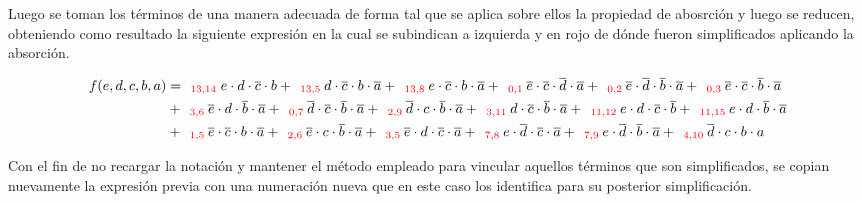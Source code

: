 Luego se toman los t\'erminos de una manera adecuada de forma tal que se aplica sobre ellos la propiedad de abosrci\'on 
y luego se reducen, obteniendo como resultado la siguiente expresi\'on en la cual se subindican a izquierda y en rojo de d\'onde
fueron simplificados aplicando la absorci\'on.

\begin{align*}
f(e,d,c,b,a) & = _{\ \ \color{red} 13,14} {e \cdot d \cdot \overline{c} \cdot b} 
+ _{\ \ \color{red} 13,5}  {d \cdot \overline{c} \cdot b \cdot \overline{a}}
+ _{\ \ \color{red} 13,8}  {e \cdot \overline{c} \cdot b \cdot \overline{a}}
+ _{\ \ \color{red} 0,1}  {\overline{e} \cdot \overline{c} \cdot \overline{d} \cdot \overline{a}}
+ _{\ \ \color{red} 0,2}  {\overline{e} \cdot \overline{d} \cdot \overline{b} \cdot \overline{a}}
+ _{\ \ \color{red} 0,3}  {\overline{e} \cdot \overline{c} \cdot \overline{b} \cdot \overline{a}} \\
& + _{\ \ \color{red} 3,6}  {\overline{e} \cdot d \cdot \overline{b} \cdot \overline{a}} 
+ _{\ \ \color{red} 0,7}  {\overline{d} \cdot \overline{c} \cdot \overline{b} \cdot \overline{a}}
+ _{\ \ \color{red} 2,9}  {\overline{d} \cdot c \cdot \overline{b} \cdot \overline{a}}
+ _{\ \ \color{red} 3,11}  {d \cdot \overline{c} \cdot \overline{b} \cdot \overline{a}} 
+ _{\ \ \color{red} 11,12}  {e \cdot d \cdot \overline{c} \cdot \overline{b}}
+ _{\ \ \color{red} 11,15}  {e \cdot d \cdot \overline{b} \cdot \overline{a}} \\
& + _{\ \ \color{red} 1,5}  {\overline{e} \cdot \overline{c} \cdot b \cdot \overline{a}}
+ _{\ \ \color{red} 2,6}  {\overline{e} \cdot c \cdot \overline{b} \cdot \overline{a}} 
+ _{\ \ \color{red} 3,5}  {\overline{e} \cdot d \cdot \overline{c} \cdot \overline{a}}
+ _{\ \ \color{red} 7,8}  {e \cdot \overline{d} \cdot \overline{c} \cdot \overline{a}} 
+ _{\ \ \color{red} 7,9}  {e \cdot \overline{d} \cdot \overline{b} \cdot \overline{a}}
+ _{\ \ \color{red} 4,10}  {\overline{d} \cdot c \cdot b \cdot a}
\end{align*}

Con el fin de no recargar la notaci\'on y mantener el m\'etodo empleado para vincular aquellos
t\'erminos que son simplificados, se copian nuevamente la expresi\'on previa con una numeraci\'on nueva
que en este caso los identifica para su posterior simplificaci\'on.

